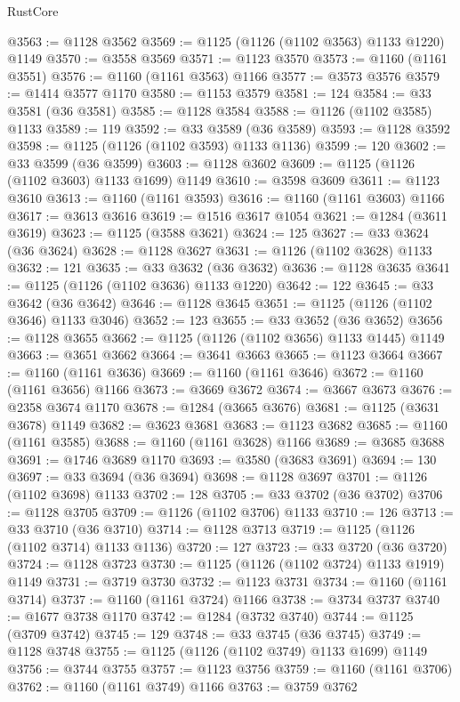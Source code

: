 \begin{lexlean}{RustCore}
\begin{coremodule}
@3563 := @1128 @3562
@3569 := @1125 (@1126 (@1102 @3563) @1133 @1220) @1149
@3570 := @3558 @3569
@3571 := @1123 @3570
@3573 := @1160 (@1161 @3551)
@3576 := @1160 (@1161 @3563) @1166
@3577 := @3573 @3576
@3579 := @1414 @3577 @1170
@3580 := @1153 @3579
@3581 := 124
@3584 := @33 @3581 (@36 @3581)
@3585 := @1128 @3584
@3588 := @1126 (@1102 @3585) @1133
@3589 := 119
@3592 := @33 @3589 (@36 @3589)
@3593 := @1128 @3592
@3598 := @1125 (@1126 (@1102 @3593) @1133 @1136)
@3599 := 120
@3602 := @33 @3599 (@36 @3599)
@3603 := @1128 @3602
@3609 := @1125 (@1126 (@1102 @3603) @1133 @1699) @1149
@3610 := @3598 @3609
@3611 := @1123 @3610
@3613 := @1160 (@1161 @3593)
@3616 := @1160 (@1161 @3603) @1166
@3617 := @3613 @3616
@3619 := @1516 @3617 @1054
@3621 := @1284 (@3611 @3619)
@3623 := @1125 (@3588 @3621)
@3624 := 125
@3627 := @33 @3624 (@36 @3624)
@3628 := @1128 @3627
@3631 := @1126 (@1102 @3628) @1133
@3632 := 121
@3635 := @33 @3632 (@36 @3632)
@3636 := @1128 @3635
@3641 := @1125 (@1126 (@1102 @3636) @1133 @1220)
@3642 := 122
@3645 := @33 @3642 (@36 @3642)
@3646 := @1128 @3645
@3651 := @1125 (@1126 (@1102 @3646) @1133 @3046)
@3652 := 123
@3655 := @33 @3652 (@36 @3652)
@3656 := @1128 @3655
@3662 := @1125 (@1126 (@1102 @3656) @1133 @1445) @1149
@3663 := @3651 @3662
@3664 := @3641 @3663
@3665 := @1123 @3664
@3667 := @1160 (@1161 @3636)
@3669 := @1160 (@1161 @3646)
@3672 := @1160 (@1161 @3656) @1166
@3673 := @3669 @3672
@3674 := @3667 @3673
@3676 := @2358 @3674 @1170
@3678 := @1284 (@3665 @3676)
@3681 := @1125 (@3631 @3678) @1149
@3682 := @3623 @3681
@3683 := @1123 @3682
@3685 := @1160 (@1161 @3585)
@3688 := @1160 (@1161 @3628) @1166
@3689 := @3685 @3688
@3691 := @1746 @3689 @1170
@3693 := @3580 (@3683 @3691)
@3694 := 130
@3697 := @33 @3694 (@36 @3694)
@3698 := @1128 @3697
@3701 := @1126 (@1102 @3698) @1133
@3702 := 128
@3705 := @33 @3702 (@36 @3702)
@3706 := @1128 @3705
@3709 := @1126 (@1102 @3706) @1133
@3710 := 126
@3713 := @33 @3710 (@36 @3710)
@3714 := @1128 @3713
@3719 := @1125 (@1126 (@1102 @3714) @1133 @1136)
@3720 := 127
@3723 := @33 @3720 (@36 @3720)
@3724 := @1128 @3723
@3730 := @1125 (@1126 (@1102 @3724) @1133 @1919) @1149
@3731 := @3719 @3730
@3732 := @1123 @3731
@3734 := @1160 (@1161 @3714)
@3737 := @1160 (@1161 @3724) @1166
@3738 := @3734 @3737
@3740 := @1677 @3738 @1170
@3742 := @1284 (@3732 @3740)
@3744 := @1125 (@3709 @3742)
@3745 := 129
@3748 := @33 @3745 (@36 @3745)
@3749 := @1128 @3748
@3755 := @1125 (@1126 (@1102 @3749) @1133 @1699) @1149
@3756 := @3744 @3755
@3757 := @1123 @3756
@3759 := @1160 (@1161 @3706)
@3762 := @1160 (@1161 @3749) @1166
@3763 := @3759 @3762

\end{coremodule}
\end{lexlean}
